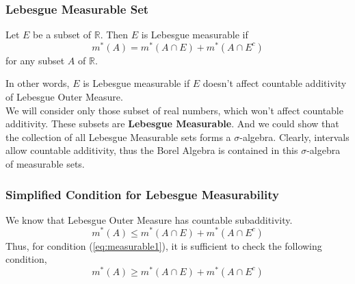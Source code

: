 \subsubsection{Lebesgue Measurable Set}
\begin{definition}
	Let $E$ be a subset of $\mathbb{R}$.
	Then $E$ is Lebesgue measurable if
\begin{equation}
	m^\ast(A) = m^\ast(A \cap E) + m^\ast(A \cap E^c)
	\label{eq:measurable1}
\end{equation}
	for any subset $A$ of $\mathbb{R}$.
\end{definition}

	In other words, $E$ is Lebesgue measurable if $E$ doesn't affect countable additivity of Lebesgue Outer Measure.\\

	We will consider only those subset of real numbers, which won't affect countable additivity.
	These subsets are \textbf{Lebesgue Measurable}.
	And we could show that the collection of all Lebesgue Measurable sets forms a $\sigma$-algebra.
	Clearly, intervals allow countable additivity, thus the Borel Algebra is contained in this $\sigma$-algebra of measurable sets.
\subsubsection{Simplified Condition for Lebesgue Measurability}

We know that Lebesgue Outer Measure has countable subadditivity.
\begin{equation*}
	m^\ast(A) \le m^\ast(A \cap E) + m^\ast(A \cap E^c)
\end{equation*}
Thus, for condition (\ref{eq:measurable1}), it is sufficient to check the following condition,
\begin{equation}
	m^\ast(A) \ge m^\ast(A \cap E) + m^\ast(A \cap E^c)
	\label{eq:measurable2}
\end{equation}

